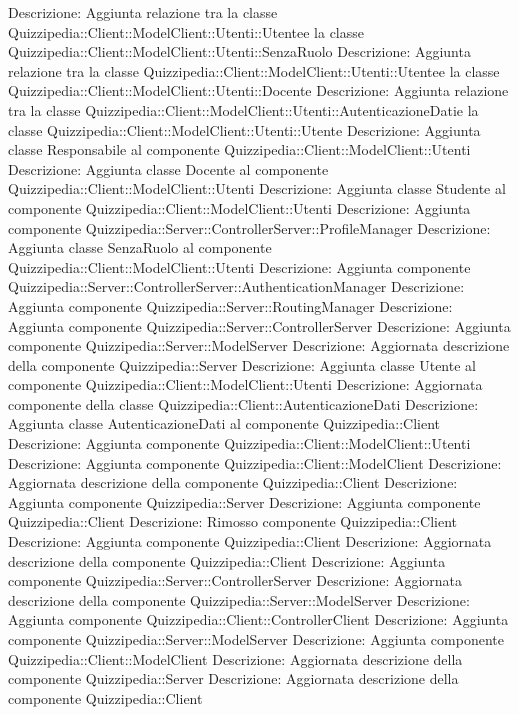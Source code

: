 Descrizione: Aggiunta relazione tra la classe Quizzipedia::Client::ModelClient::Utenti::Utentee la classe Quizzipedia::Client::ModelClient::Utenti::SenzaRuolo 
Descrizione: Aggiunta relazione tra la classe Quizzipedia::Client::ModelClient::Utenti::Utentee la classe Quizzipedia::Client::ModelClient::Utenti::Docente 
Descrizione: Aggiunta relazione tra la classe Quizzipedia::Client::ModelClient::Utenti::AutenticazioneDatie la classe Quizzipedia::Client::ModelClient::Utenti::Utente 
Descrizione: Aggiunta classe Responsabile al componente Quizzipedia::Client::ModelClient::Utenti 
Descrizione: Aggiunta classe Docente al componente Quizzipedia::Client::ModelClient::Utenti 
Descrizione: Aggiunta classe Studente al componente Quizzipedia::Client::ModelClient::Utenti 
Descrizione: Aggiunta componente Quizzipedia::Server::ControllerServer::ProfileManager 
Descrizione: Aggiunta classe SenzaRuolo al componente Quizzipedia::Client::ModelClient::Utenti 
Descrizione: Aggiunta componente Quizzipedia::Server::ControllerServer::AuthenticationManager 
Descrizione: Aggiunta componente Quizzipedia::Server::RoutingManager 
Descrizione: Aggiunta componente Quizzipedia::Server::ControllerServer 
Descrizione: Aggiunta componente Quizzipedia::Server::ModelServer 
Descrizione: Aggiornata descrizione della componente Quizzipedia::Server 
Descrizione: Aggiunta classe Utente al componente Quizzipedia::Client::ModelClient::Utenti 
Descrizione: Aggiornata componente della classe Quizzipedia::Client::AutenticazioneDati 
Descrizione: Aggiunta classe AutenticazioneDati al componente Quizzipedia::Client 
Descrizione: Aggiunta componente Quizzipedia::Client::ModelClient::Utenti 
Descrizione: Aggiunta componente Quizzipedia::Client::ModelClient 
Descrizione: Aggiornata descrizione della componente Quizzipedia::Client 
Descrizione: Aggiunta componente Quizzipedia::Server 
Descrizione: Aggiunta componente Quizzipedia::Client 
Descrizione: Rimosso componente Quizzipedia::Client 
Descrizione: Aggiunta componente Quizzipedia::Client 
Descrizione: Aggiornata descrizione della componente Quizzipedia::Client 
Descrizione: Aggiunta componente Quizzipedia::Server::ControllerServer 
Descrizione: Aggiornata descrizione della componente Quizzipedia::Server::ModelServer 
Descrizione: Aggiunta componente Quizzipedia::Client::ControllerClient 
Descrizione: Aggiunta componente Quizzipedia::Server::ModelServer 
Descrizione: Aggiunta componente Quizzipedia::Client::ModelClient 
Descrizione: Aggiornata descrizione della componente Quizzipedia::Server 
Descrizione: Aggiornata descrizione della componente Quizzipedia::Client 
